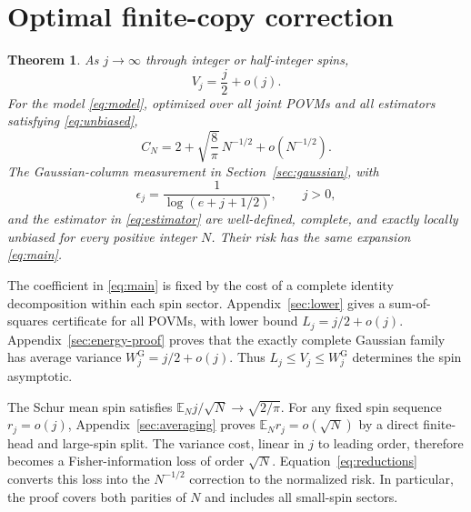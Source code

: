\documentclass[aps,pra,reprint,superscriptaddress,longbibliography]{revtex4-2}
\newtheorem{theorem}{Theorem}
\theoremstyle{remark}
\newcommand{\g}{\mathrm G}
\begin{document}
\section{Optimal finite-copy correction}\label{sec:result}
\begin{theorem}\label{thm:main}As $j\to\infty$ through integer or half-integer spins,
\begin{equation}
 V_j=\frac j2+o(j).
 \label{eq:roof-asymptotic}
\end{equation}
For the model \eqref{eq:model}, optimized over all joint POVMs and all
estimators satisfying \eqref{eq:unbiased},
\begin{equation}
 \boxed{\displaystyle
 C_N=2+\sqrt{\frac8\pi}\,N^{-1/2}+o(N^{-1/2}).}
 \label{eq:main}
\end{equation}
The Gaussian-column measurement in Section~\ref{sec:gaussian}, with
\begin{equation}
 \epsilon_j=\frac1{\log(e+j+1/2)},\qquad j>0,
 \label{eq:epsilon}
\end{equation}
and the estimator in \eqref{eq:estimator} are well-defined, complete,
and exactly locally unbiased for every positive integer $N$. Their
risk has the same expansion \eqref{eq:main}.
\end{theorem}


The coefficient in \eqref{eq:main} is fixed by the cost of a complete
identity decomposition within each spin sector. Appendix~\ref{sec:lower} gives a sum-of-squares
certificate for all POVMs, with lower bound $L_j=j/2+o(j)$.
Appendix~\ref{sec:energy-proof} proves that the exactly complete
Gaussian family has average variance $W_j^{\g}=j/2+o(j)$.
Thus $L_j\leq V_j\leq W_j^{\g}$ determines the spin asymptotic.

The Schur mean spin satisfies
$\mathbb E_N j/\sqrt N\to\sqrt{2/\pi}$. For any fixed spin sequence
$r_j=o(j)$, Appendix~\ref{sec:averaging} proves
$\mathbb E_N r_j=o(\sqrt N)$ by a direct finite-head and
large-spin split. The variance cost, linear in $j$ to leading order,
therefore becomes a Fisher-information loss of order $\sqrt N$.
Equation~\eqref{eq:reductions} converts this loss into the $N^{-1/2}$
correction to the normalized risk. In particular,
the proof covers both parities of $N$ and includes all small-spin
sectors.
\end{document}
